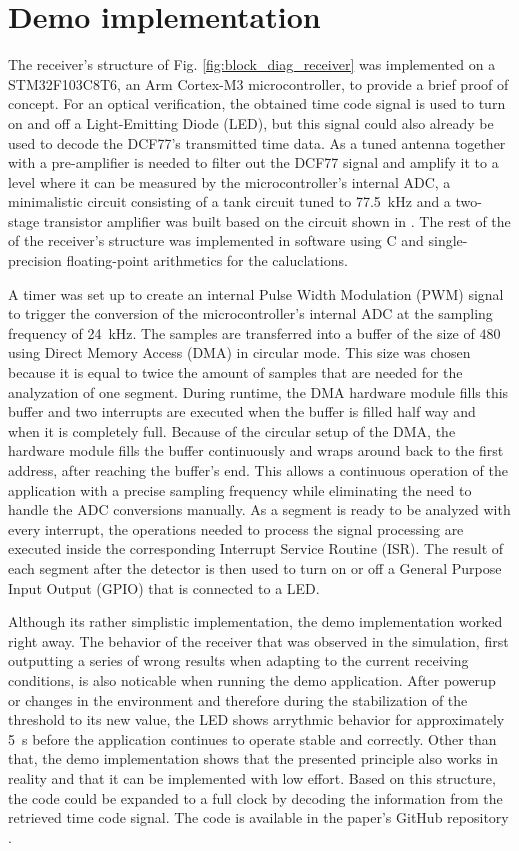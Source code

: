 \documentclass[conference]{IEEEtran}
\begin{document}
\section{Demo implementation}
The receiver's structure of Fig. \ref{fig:block_diag_receiver} was implemented on a STM32F103C8T6, an Arm Cortex-M3 microcontroller, to provide a brief proof of concept.
For an optical verification, the obtained time code signal is used to turn on and off a Light-Emitting Diode (LED), but this signal
could also already be used to decode the DCF77's transmitted time data.
As a tuned antenna together with a pre-amplifier is needed to filter out the DCF77 signal and amplify it to a level where it can be measured by the microcontroller's internal ADC, a minimalistic circuit 
consisting of a tank circuit tuned to \SI{77.5}{\kilo\hertz} and a two-stage transistor amplifier was built based on the circuit shown in \cite{b12}.
The rest of the of the receiver's structure was implemented in software using C and single-precision floating-point arithmetics for the caluclations.
\par
A timer was set up to create an internal Pulse Width Modulation (PWM) signal to trigger the conversion of the microcontroller's internal ADC at the sampling frequency of \SI{24}{\kilo\hertz}.
The samples are transferred into a buffer of the size of $480$ using Direct Memory Access (DMA) in circular mode.
This size was chosen because it is equal to twice the amount of samples that are needed for the analyzation of one segment.
During runtime, the DMA hardware module fills this buffer and two interrupts are executed when the buffer is filled half way and when it is completely full.
Because of the circular setup of the DMA, the hardware module fills the buffer continuously and wraps around back to the first address, after reaching the buffer's end.
This allows a continuous operation of the application with a precise sampling frequency while eliminating the need to handle the ADC conversions manually. 
As a segment is ready to be analyzed with every interrupt, the operations needed to process the signal processing are executed inside the corresponding Interrupt Service Routine (ISR).
The result of each segment after the detector is then used to turn on or off a General Purpose Input Output (GPIO) that is connected to a LED.
\par
Although its rather simplistic implementation, the demo implementation worked right away.
The behavior of the receiver that was observed in the simulation, first outputting a series of wrong results when adapting to the
current receiving conditions, is also noticable when running the demo application.
After powerup or changes in the environment and therefore during the stabilization of the threshold to its new value, the LED shows
arrythmic behavior for approximately \SI{5}{\second} before the application continues to operate stable and correctly.
Other than that, the demo implementation shows that the presented principle also works in reality and that it can be implemented
with low effort.
Based on this structure, the code could be expanded to a full clock by decoding the information from the retrieved time code signal.
The code is available in the paper's GitHub repository \cite{b13}.
\end{document}
